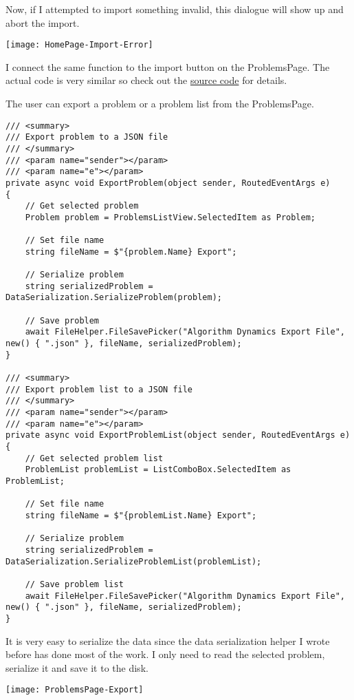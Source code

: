\documentclass[report.tex]{subfiles}
\begin{document}
Now, if I attempted to import something invalid, this dialogue will show up and abort the import.

\texttt{[image: HomePage-Import-Error]}

I connect the same function to the import button on the ProblemsPage. The actual code is very similar so check out the \hyperref[subsubsec:problemspage]{source code} for details.

The user can export a problem or a problem list from the ProblemsPage.

\begin{verbatim}
/// <summary>
/// Export problem to a JSON file
/// </summary>
/// <param name="sender"></param>
/// <param name="e"></param>
private async void ExportProblem(object sender, RoutedEventArgs e)
{
    // Get selected problem
    Problem problem = ProblemsListView.SelectedItem as Problem;
    
    // Set file name
    string fileName = $"{problem.Name} Export";
    
    // Serialize problem
    string serializedProblem = DataSerialization.SerializeProblem(problem);
    
    // Save problem
    await FileHelper.FileSavePicker("Algorithm Dynamics Export File", new() { ".json" }, fileName, serializedProblem);
}

/// <summary>
/// Export problem list to a JSON file
/// </summary>
/// <param name="sender"></param>
/// <param name="e"></param>
private async void ExportProblemList(object sender, RoutedEventArgs e)
{
    // Get selected problem list
    ProblemList problemList = ListComboBox.SelectedItem as ProblemList;
    
    // Set file name
    string fileName = $"{problemList.Name} Export";
    
    // Serialize problem
    string serializedProblem = DataSerialization.SerializeProblemList(problemList);
    
    // Save problem list
    await FileHelper.FileSavePicker("Algorithm Dynamics Export File", new() { ".json" }, fileName, serializedProblem);
}
\end{verbatim}

It is very easy to serialize the data since the data serialization helper I wrote before has done most of the work. I only need to read the selected problem, serialize it and save it to the disk.

\texttt{[image: ProblemsPage-Export]}
\end{document}
